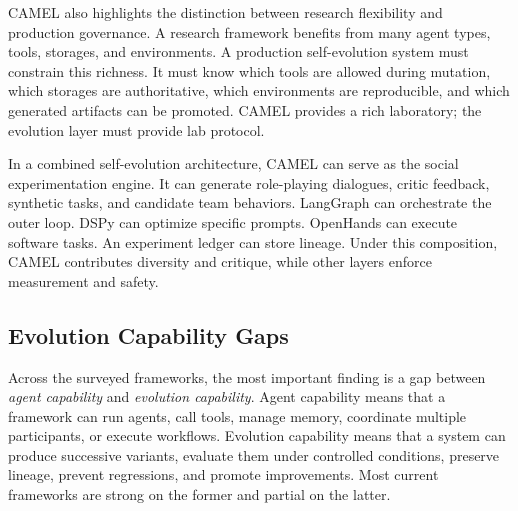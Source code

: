 CAMEL also highlights the distinction between research flexibility and production governance.  A research framework benefits from many agent types, tools, storages, and environments.  A production self-evolution system must constrain this richness.  It must know which tools are allowed during mutation, which storages are authoritative, which environments are reproducible, and which generated artifacts can be promoted.  CAMEL provides a rich laboratory; the evolution layer must provide lab protocol.

In a combined self-evolution architecture, CAMEL can serve as the social experimentation engine.  It can generate role-playing dialogues, critic feedback, synthetic tasks, and candidate team behaviors.  LangGraph can orchestrate the outer loop.  DSPy can optimize specific prompts.  OpenHands can execute software tasks.  An experiment ledger can store lineage.  Under this composition, CAMEL contributes diversity and critique, while other layers enforce measurement and safety.

\subsection{Evolution Capability Gaps}
\label{subsec:evolution-capability-gaps}

Across the surveyed frameworks, the most important finding is a gap between \emph{agent capability} and \emph{evolution capability}.  Agent capability means that a framework can run agents, call tools, manage memory, coordinate multiple participants, or execute workflows.  Evolution capability means that a system can produce successive variants, evaluate them under controlled conditions, preserve lineage, prevent regressions, and promote improvements.  Most current frameworks are strong on the former and partial on the latter.

